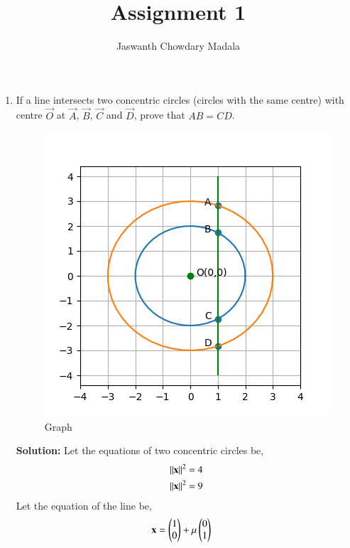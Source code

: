 \documentclass[journal,12pt,twocolumn]{IEEEtran}
\begin{document}
\vspace{3cm}


\title{Assignment 1}
\author{Jaswanth Chowdary Madala}





\maketitle

\newpage


\bigskip

\renewcommand{\thefigure}{\theenumi}
\renewcommand{\thetable}{\theenumi}


\begin{enumerate}
\item If a line intersects two concentric circles (circles
with the same centre) with centre $\vec{O}$ at $\vec{A}$, $\vec{B}$, $\vec{C}$ and $\vec{D}$, prove that $AB = CD$.
\begin{figure}[ht]
\centering
\includegraphics[width = \columnwidth]{figs/fig.png}
\caption{Graph}
\label{fig:1}
\end{figure}

\textbf{Solution:}
Let the equations of two concentric circles be,
\begin{align}
\left\lVert\mathbf{x}\right\rVert^2 &= 4
\label{eq:1}\\
\left\lVert\mathbf{x}\right\rVert^2 &= 9
\label{eq:2}
\end{align}
Let the equation of the line be,
\begin{align}
\mathbf{x} &= \begin{pmatrix}1\\0\end{pmatrix} + \mu \begin{pmatrix}0\\1\end{pmatrix}
\end{align}


\end{enumerate}
\end{document}
